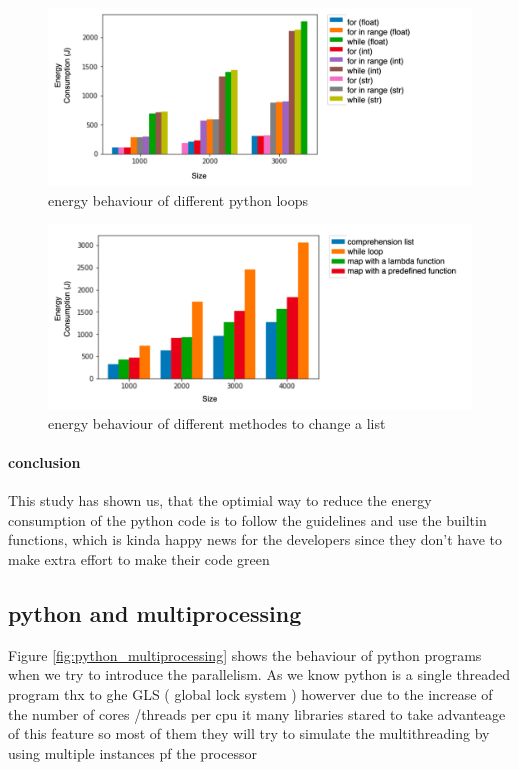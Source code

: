 \begin{figure}
    \centering
    \includegraphics[width=\linewidth]{imgs/python_iterations}
    \caption{energy behaviour of different python loops }
    \label{fig:pythonloops}
\end{figure}


\begin{figure}
    \centering
    \includegraphics[width=\linewidth]{imgs/python_treatemens}
    \caption{energy behaviour of different methodes to change a list}
    \label{fig:pythontreatement}
\end{figure}

\paragraph{conclusion}
This study has shown us, that the optimial way to reduce the energy consumption of the python code is to follow the guidelines and use the builtin functions, which is kinda happy news for the developers since they don't have to make extra effort to make their code green


\subsection{python and multiprocessing}
Figure \ref{fig:python_multiprocessing} shows the behaviour of python programs when we try to introduce the parallelism.
As we know python is a single threaded program thx to ghe GLS ( global lock system ) howerver due to the increase of the number of cores /threads per cpu it many libraries stared to take advanteage of this feature so most of them they will try to simulate the multithreading by using multiple instances pf the processor %

